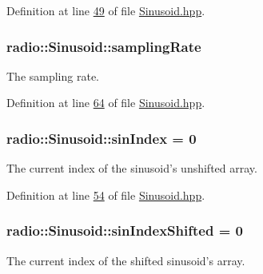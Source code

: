 Definition at line \hyperlink{Sinusoid_8hpp_source_l00049}{49} of file \hyperlink{Sinusoid_8hpp_source}{Sinusoid.\+hpp}.

\hypertarget{classradio_1_1Sinusoid_a964d64aae9acc4ea5d752534a33d76b8}{
\subsubsection[{sampling\+Rate}]{ radio\+::\+Sinusoid\+::sampling\+Rate\hspace{0.3cm}{\ttfamily [protected]}}}\label{classradio_1_1Sinusoid_a964d64aae9acc4ea5d752534a33d76b8}
The sampling rate. 

Definition at line \hyperlink{Sinusoid_8hpp_source_l00064}{64} of file \hyperlink{Sinusoid_8hpp_source}{Sinusoid.\+hpp}.

\hypertarget{classradio_1_1Sinusoid_a2e7d029c5e7307967c77959367cc0224}{
\subsubsection[{sin\+Index}]{ radio\+::\+Sinusoid\+::sin\+Index = 0\hspace{0.3cm}{\ttfamily [protected]}}}\label{classradio_1_1Sinusoid_a2e7d029c5e7307967c77959367cc0224}
The current index of the sinusoid's unshifted array. 

Definition at line \hyperlink{Sinusoid_8hpp_source_l00054}{54} of file \hyperlink{Sinusoid_8hpp_source}{Sinusoid.\+hpp}.

\hypertarget{classradio_1_1Sinusoid_a4acf2add824249c39046fe87f9a64f93}{
\subsubsection[{sin\+Index\+Shifted}]{ radio\+::\+Sinusoid\+::sin\+Index\+Shifted = 0\hspace{0.3cm}{\ttfamily [protected]}}}\label{classradio_1_1Sinusoid_a4acf2add824249c39046fe87f9a64f93}
The current index of the shifted sinusoid's array. 


